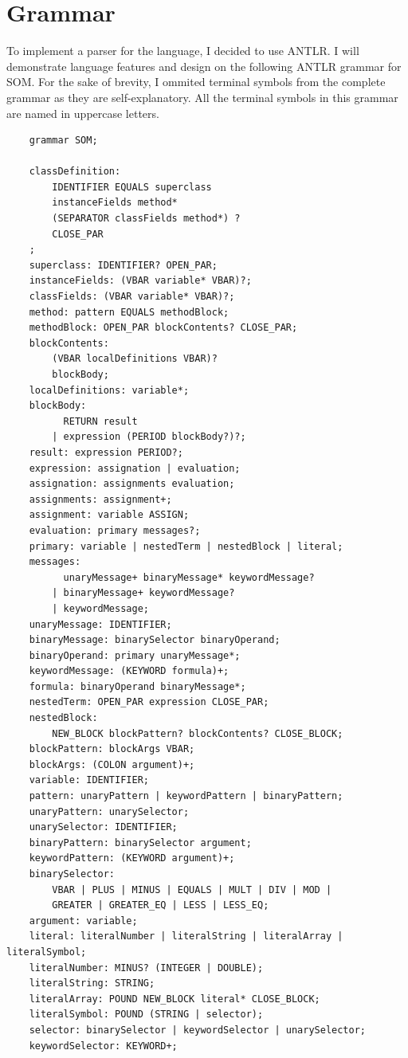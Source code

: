 \documentclass[thesis=M,english]{FITthesis}[2019/12/23]
\begin{document}
\section{Grammar}
To implement a parser for the language, I decided to use ANTLR. I will demonstrate language features and design on the following ANTLR grammar
for SOM. For the sake of brevity, I ommited terminal symbols from the complete grammar as they are self-explanatory. All the terminal symbols
in this grammar are named in uppercase letters.

\begin{verbatim}
	grammar SOM;

	classDefinition:
		IDENTIFIER EQUALS superclass
		instanceFields method*
		(SEPARATOR classFields method*) ?
		CLOSE_PAR
	;
	superclass: IDENTIFIER? OPEN_PAR;
	instanceFields: (VBAR variable* VBAR)?;
	classFields: (VBAR variable* VBAR)?;
	method: pattern EQUALS methodBlock;
	methodBlock: OPEN_PAR blockContents? CLOSE_PAR;
	blockContents:
		(VBAR localDefinitions VBAR)?
		blockBody;
	localDefinitions: variable*;
	blockBody: 
		  RETURN result
		| expression (PERIOD blockBody?)?;
	result: expression PERIOD?;
	expression: assignation | evaluation;
	assignation: assignments evaluation;
	assignments: assignment+;
	assignment: variable ASSIGN;
	evaluation: primary messages?;
	primary: variable | nestedTerm | nestedBlock | literal;
	messages:
		  unaryMessage+ binaryMessage* keywordMessage?
		| binaryMessage+ keywordMessage?
		| keywordMessage;
	unaryMessage: IDENTIFIER;
	binaryMessage: binarySelector binaryOperand;
	binaryOperand: primary unaryMessage*;
	keywordMessage: (KEYWORD formula)+;
	formula: binaryOperand binaryMessage*;
	nestedTerm: OPEN_PAR expression CLOSE_PAR;
	nestedBlock:
		NEW_BLOCK blockPattern? blockContents? CLOSE_BLOCK;
	blockPattern: blockArgs VBAR;
	blockArgs: (COLON argument)+;
	variable: IDENTIFIER;
	pattern: unaryPattern | keywordPattern | binaryPattern;
	unaryPattern: unarySelector;
	unarySelector: IDENTIFIER;
	binaryPattern: binarySelector argument;
	keywordPattern: (KEYWORD argument)+;
	binarySelector: 
		VBAR | PLUS | MINUS | EQUALS | MULT | DIV | MOD |
		GREATER | GREATER_EQ | LESS | LESS_EQ;
	argument: variable;
	literal: literalNumber | literalString | literalArray | literalSymbol;
	literalNumber: MINUS? (INTEGER | DOUBLE);
	literalString: STRING;
	literalArray: POUND NEW_BLOCK literal* CLOSE_BLOCK;
	literalSymbol: POUND (STRING | selector);
	selector: binarySelector | keywordSelector | unarySelector;
	keywordSelector: KEYWORD+;
\end{verbatim}
\end{document}
